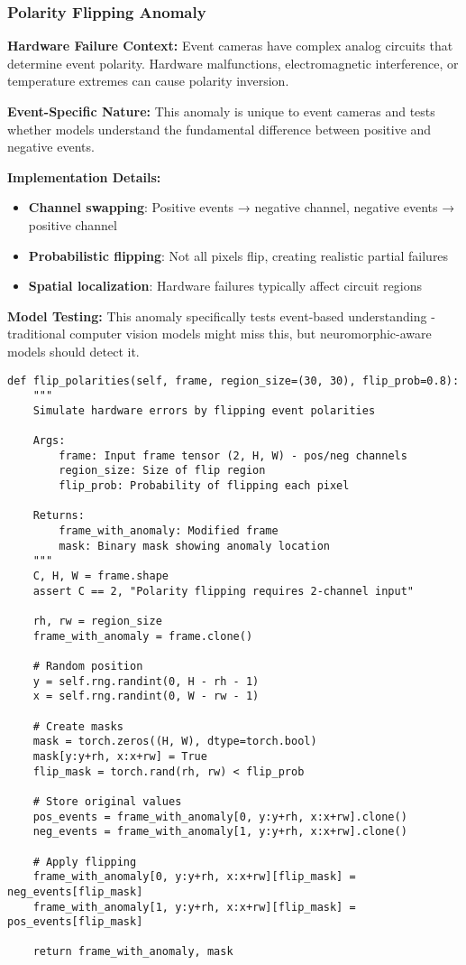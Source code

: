 \documentclass[12pt,a4paper]{article}
\begin{document}
\subsubsection{Polarity Flipping Anomaly}

\textbf{Hardware Failure Context:} Event cameras have complex analog circuits that determine event polarity. Hardware malfunctions, electromagnetic interference, or temperature extremes can cause polarity inversion.

\textbf{Event-Specific Nature:} This anomaly is unique to event cameras and tests whether models understand the fundamental difference between positive and negative events.

\textbf{Implementation Details:}
\begin{itemize}
    \item \textbf{Channel swapping}: Positive events → negative channel, negative events → positive channel
    \item \textbf{Probabilistic flipping}: Not all pixels flip, creating realistic partial failures
    \item \textbf{Spatial localization}: Hardware failures typically affect circuit regions
\end{itemize}

\textbf{Model Testing:} This anomaly specifically tests event-based understanding - traditional computer vision models might miss this, but neuromorphic-aware models should detect it.

\begin{lstlisting}[caption={Polarity Flipping Implementation - Simulating Circuit Malfunctions}]
def flip_polarities(self, frame, region_size=(30, 30), flip_prob=0.8):
    """
    Simulate hardware errors by flipping event polarities

    Args:
        frame: Input frame tensor (2, H, W) - pos/neg channels
        region_size: Size of flip region
        flip_prob: Probability of flipping each pixel

    Returns:
        frame_with_anomaly: Modified frame
        mask: Binary mask showing anomaly location
    """
    C, H, W = frame.shape
    assert C == 2, "Polarity flipping requires 2-channel input"

    rh, rw = region_size
    frame_with_anomaly = frame.clone()

    # Random position
    y = self.rng.randint(0, H - rh - 1)
    x = self.rng.randint(0, W - rw - 1)

    # Create masks
    mask = torch.zeros((H, W), dtype=torch.bool)
    mask[y:y+rh, x:x+rw] = True
    flip_mask = torch.rand(rh, rw) < flip_prob

    # Store original values
    pos_events = frame_with_anomaly[0, y:y+rh, x:x+rw].clone()
    neg_events = frame_with_anomaly[1, y:y+rh, x:x+rw].clone()

    # Apply flipping
    frame_with_anomaly[0, y:y+rh, x:x+rw][flip_mask] = neg_events[flip_mask]
    frame_with_anomaly[1, y:y+rh, x:x+rw][flip_mask] = pos_events[flip_mask]

    return frame_with_anomaly, mask
\end{lstlisting}
\end{document}

